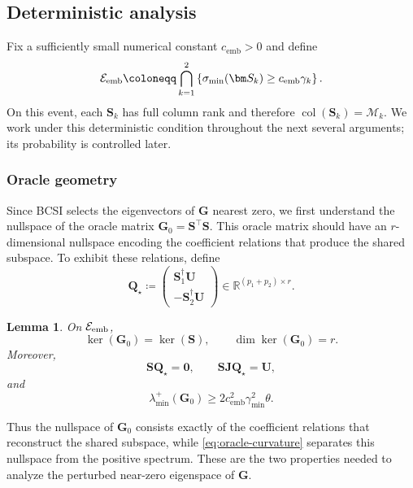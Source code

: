 \documentclass[11pt]{article}
\newtheorem{lemma}{Lemma}
\newcommand{\trans}{\top}
\newcommand{\cM}{\mathcal{M}}
\newcommand{\cE}{\mathcal{E}}
\newcommand{\gmin}{\gamma_{\min}}
\newcommand{\cemb}{c_{\mathrm{emb}}}
\begin{document}
\subsection{Deterministic analysis}
\label{sec:deterministic-analysis}


Fix a sufficiently small numerical constant $\cemb>0$ and define
\begin{equation}
\label{eq:Eemb}
  \cE_{\rm emb}
  \coloneqq
  \bigcap_{k=1}^2
  \left\{
    \sigma_{\min}(\bm S_k)\ge \cemb\gamma_k
  \right\}.
\end{equation}
On this event, each $\bm S_k$ has full column rank and therefore
$\operatorname{col}(\bm S_k)=\cM_k$. We work under this deterministic
condition throughout the next several arguments; its probability is
controlled later.



\subsubsection{Oracle geometry}

Since BCSI selects the eigenvectors of $\bm G$ nearest zero, we first
understand the nullspace of the oracle matrix $\bm G_0=\bm S^\trans\bm S$. 
This oracle matrix should have an
$r$-dimensional nullspace encoding the coefficient relations that produce
the shared subspace. To exhibit these relations, define
\[
  \bm Q_\star
  \coloneqq
  \begin{pmatrix}
    \bm S_1^\dagger\bm U\\
    -\bm S_2^\dagger\bm U
  \end{pmatrix}
   \in\mathbb R^{(p_1+p_2)\times r}.
\]

\begin{lemma}
\label{lem:oracle-geometry}
On $\cE_{\rm emb}$,
\[
  \ker(\bm G_0)=\ker(\bm S),
  \qquad
  \dim\ker(\bm G_0)=r.
\]
Moreover,
\begin{equation}
\label{eq:Q_star}
  \bm S\bm Q_\star=\bm 0,
  \qquad
  \bm S\bm J\bm Q_\star=\bm U,
\end{equation}
and
\begin{equation}
\label{eq:oracle-curvature}
  \lambda_{\min}^{+}(\bm G_0)
  \ge
  2\cemb^2\gmin^2\theta.
\end{equation}
\end{lemma}

Thus the nullspace of $\bm G_0$ consists exactly of the coefficient
relations that reconstruct the shared subspace, while
\cref{eq:oracle-curvature} separates this nullspace from the positive
spectrum. These are the two properties needed to analyze the perturbed
near-zero eigenspace of $\bm G$.
\end{document}

